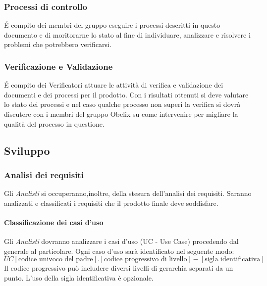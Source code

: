 

\subsubsection{Processi di controllo}

\'E compito dei membri del gruppo eseguire i processi descritti in questo documento e di moritorarne lo stato al fine di individuare, analizzare e risolvere i problemi che potrebbero verificarsi.

\subsubsection{Verificazione e Validazione}

\'E compito dei Verificatori attuare le attività di verifica e validazione dei documenti e dei processi per il prodotto.
Con i risultati ottenuti si deve valutare lo stato dei processi e nel caso qualche processo non superi la verifica si dovrà discutere con i membri del gruppo Obelix su come intervenire per migliare la qualità del processo in questione.







\subsection{Sviluppo}

\subsubsection{Analisi dei requisiti}

Gli \emph{Analisti} si occuperanno,inoltre, della stesura dell'analisi dei
requisiti. Saranno analizzati e classificati i requisiti che il
prodotto finale deve soddisfare.


\paragraph{Classificazione dei casi d'uso} 

Gli \emph{Analisti} dovranno analizzare i
casi d'uso (UC - Use Case) procedendo dal generale al particolare. Ogni
caso d'uso sarà identificato nel seguente modo: 
$$ UC[\text{codice univoco del padre}].[\text{codice progressivo di livello}]-[\text{sigla identificativa}] $$ 
Il codice progressivo può includere diversi livelli di gerarchia
separati da un punto. L'uso della sigla identificativa è
opzionale.

